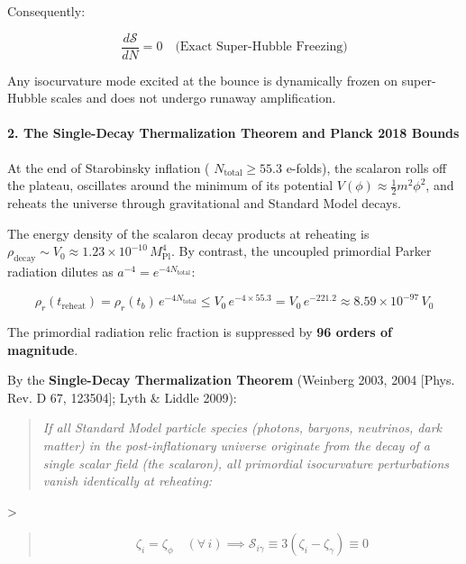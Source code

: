 \documentclass[11pt,a4paper]{article}
\theoremstyle{definition}\newtheorem{definition}{Definition}
\theoremstyle{remark}\newtheorem{remark}{Remark}
\begin{document}
Consequently:


\begin{equation}
\frac{d\mathcal{S}}{dN} = 0 \quad \text{(Exact Super-Hubble Freezing)}
\end{equation}


Any isocurvature mode excited at the bounce is dynamically frozen on super-Hubble scales and does not undergo runaway amplification.
\paragraph{2. The Single-Decay Thermalization Theorem and Planck 2018 Bounds}

At the end of Starobinsky inflation ( $N_{\text{total}} \ge 55.3$ e-folds), the scalaron rolls off the plateau, oscillates around the minimum of its potential $V(\phi) \approx \frac{1}{2} m^2 \phi^2$, and reheats the universe through gravitational and Standard Model decays.

The energy density of the scalaron decay products at reheating is $\rho_{\text{decay}} \sim V_0 \approx 1.23 \times 10^{-10} \, M_{\text{Pl}}^4$. By contrast, the uncoupled primordial Parker radiation dilutes as $a^{-4} = e^{-4 N_{\text{total}}}$:


\begin{equation}
\rho_r(t_{\text{reheat}}) = \rho_r(t_b) \, e^{-4 N_{\text{total}}} \le V_0 \, e^{-4 \times 55.3} = V_0 \, e^{-221.2} \approx 8.59 \times 10^{-97} \, V_0
\end{equation}


The primordial radiation relic fraction is suppressed by \textbf{96 orders of magnitude}.

By the \textbf{Single-Decay Thermalization Theorem} (Weinberg 2003, 2004 [Phys. Rev. D 67, 123504]; Lyth \& Liddle 2009):
\begin{quote}\textit{If all Standard Model particle species (photons, baryons, neutrinos, dark matter) in the post-inflationary universe originate from the decay of a single scalar field (the scalaron), all primordial isocurvature perturbations vanish identically at reheating:}\end{quote}
>
\begin{quote}
\begin{equation}
\zeta_i = \zeta_\phi \quad (\forall \, i) \implies \mathcal{S}_{i\gamma} \equiv 3(\zeta_i - \zeta_\gamma) \equiv 0
\end{equation}
\end{quote}
\end{document}
